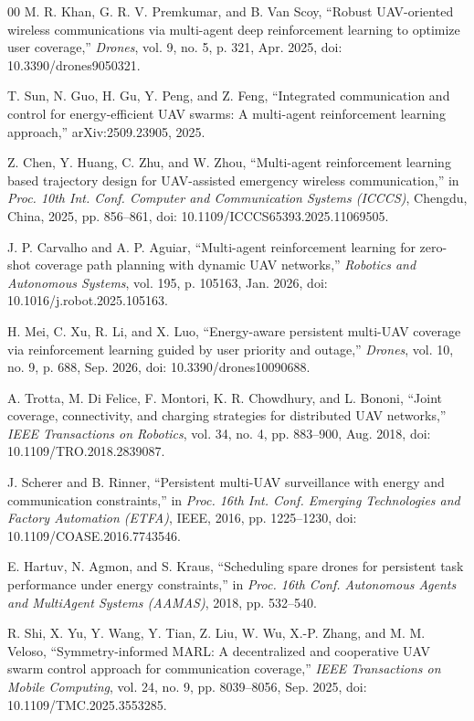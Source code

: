 \documentclass[conference]{IEEEtran}
\begin{document}
\begin{thebibliography}{00}
M. R. Khan, G. R. V. Premkumar, and B. Van Scoy, ``Robust UAV-oriented wireless communications via multi-agent deep reinforcement learning to optimize user coverage,'' \emph{Drones}, vol. 9, no. 5, p. 321, Apr. 2025, doi: 10.3390/drones9050321.

T. Sun, N. Guo, H. Gu, Y. Peng, and Z. Feng, ``Integrated communication and control for energy-efficient UAV swarms: A multi-agent reinforcement learning approach,'' arXiv:2509.23905, 2025.

Z. Chen, Y. Huang, C. Zhu, and W. Zhou, ``Multi-agent reinforcement learning based trajectory design for UAV-assisted emergency wireless communication,'' in \emph{Proc. 10th Int. Conf. Computer and Communication Systems (ICCCS)}, Chengdu, China, 2025, pp. 856--861, doi: 10.1109/ICCCS65393.2025.11069505.

J. P. Carvalho and A. P. Aguiar, ``Multi-agent reinforcement learning for zero-shot coverage path planning with dynamic UAV networks,'' \emph{Robotics and Autonomous Systems}, vol. 195, p. 105163, Jan. 2026, doi: 10.1016/j.robot.2025.105163.

H. Mei, C. Xu, R. Li, and X. Luo, ``Energy-aware persistent multi-UAV coverage via reinforcement learning guided by user priority and outage,'' \emph{Drones}, vol. 10, no. 9, p. 688, Sep. 2026, doi: 10.3390/drones10090688.

A. Trotta, M. Di Felice, F. Montori, K. R. Chowdhury, and L. Bononi, ``Joint coverage, connectivity, and charging strategies for distributed UAV networks,'' \emph{IEEE Transactions on Robotics}, vol. 34, no. 4, pp. 883--900, Aug. 2018, doi: 10.1109/TRO.2018.2839087.

J. Scherer and B. Rinner, ``Persistent multi-UAV surveillance with energy and communication constraints,'' in \emph{Proc. 16th Int. Conf. Emerging Technologies and Factory Automation (ETFA)}, IEEE, 2016, pp. 1225--1230, doi: 10.1109/COASE.2016.7743546.

E. Hartuv, N. Agmon, and S. Kraus, ``Scheduling spare drones for persistent task performance under energy constraints,'' in \emph{Proc. 16th Conf. Autonomous Agents and MultiAgent Systems (AAMAS)}, 2018, pp. 532--540.

R. Shi, X. Yu, Y. Wang, Y. Tian, Z. Liu, W. Wu, X.-P. Zhang, and M. M. Veloso, ``Symmetry-informed MARL: A decentralized and cooperative UAV swarm control approach for communication coverage,'' \emph{IEEE Transactions on Mobile Computing}, vol. 24, no. 9, pp. 8039--8056, Sep. 2025, doi: 10.1109/TMC.2025.3553285.


\end{thebibliography}
\end{document}
